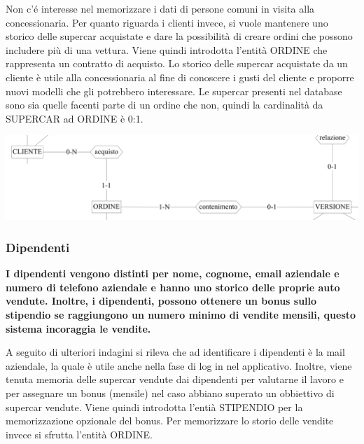 \documentclass[11pt]{article}
\begin{document}
Non c'é interesse nel memorizzare i dati di persone comuni in visita alla
concessionaria. Per quanto riguarda i clienti invece, si vuole mantenere uno
storico delle supercar acquistate e dare la possibilità di creare ordini che
possono includere più di una vettura. Viene quindi introdotta l'entità ORDINE
che rappresenta un contratto di acquisto. Lo storico delle supercar acquistate
da un cliente è utile alla concessionaria al fine di conoscere i gusti del
cliente e proporre nuovi modelli che gli potrebbero interessare.
Le supercar presenti nel database sono sia quelle facenti parte di un ordine che 
non, quindi la cardinalità da SUPERCAR ad ORDINE è 0:1.

\begin{center}
    \includegraphics[width=\linewidth]{images/partialSchemes/ordine.png}
\end{center}

\subsubsection{Dipendenti}
\textbf{I dipendenti vengono distinti per nome, cognome, email aziendale e numero di
telefono aziendale e hanno uno storico delle proprie auto vendute. Inoltre, i
dipendenti, possono ottenere un bonus sullo stipendio se raggiungono un numero
minimo di vendite mensili, questo sistema incoraggia le vendite.}

A seguito di ulteriori indagini si rileva che ad identificare i dipendenti è la
mail aziendale, la quale è utile anche nella fase di log in nel applicativo.
Inoltre, viene tenuta memoria delle supercar vendute dai dipendenti per
valutarne il lavoro e per assegnare un bonus (mensile) nel caso abbiano superato
un obbiettivo di supercar vendute. Viene quindi introdotta l'entià STIPENDIO per
la memorizzazione opzionale del bonus. Per memorizzare lo storio delle vendite
invece si sfrutta l'entità ORDINE.
\end{document}
